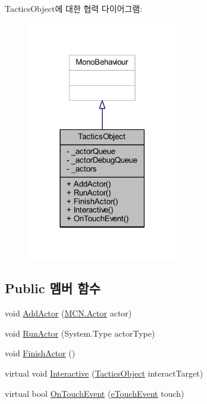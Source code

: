 Tactics\+Object에 대한 협력 다이어그램\+:\nopagebreak
\begin{figure}[H]
\begin{center}
\leavevmode
\includegraphics[width=186pt]{class_tactics_object__coll__graph}
\end{center}
\end{figure}
\subsection*{Public 멤버 함수}
\begin{DoxyCompactItemize}
\item 
void \hyperlink{class_tactics_object_a2c2b15e6cdb3639a2273978e9b9f294f}{Add\+Actor} (\hyperlink{class_m_c_n_1_1_actor}{M\+C\+N.\+Actor} actor)
\item 
void \hyperlink{class_tactics_object_ac24894e1e9355ac7bb7c94b7ea51ef02}{Run\+Actor} (System.\+Type actor\+Type)
\item 
void \hyperlink{class_tactics_object_a4e08c233c75e0f0025f13f92b4e3ec1a}{Finish\+Actor} ()
\item 
virtual void \hyperlink{class_tactics_object_a5f94ed01497a7072a2785163f4cbc57b}{Interactive} (\hyperlink{class_tactics_object}{Tactics\+Object} interact\+Target)
\item 
virtual bool \hyperlink{class_tactics_object_af34052e62ea471d21e4c601cc79ff717}{On\+Touch\+Event} (\hyperlink{_touch_manager_8cs_ae33e321a424fe84ba8b2fdb81ad40a68}{e\+Touch\+Event} touch)
\end{DoxyCompactItemize}
